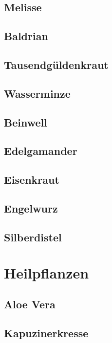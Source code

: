 \subsection{Melisse}

\subsection{Baldrian}

\subsection{Tausendgüldenkraut}

\subsection{Wasserminze}

\subsection{Beinwell}

\subsection{Edelgamander}

\subsection{Eisenkraut}

\subsection{Engelwurz}

\subsection{Silberdistel}



\section{Heilpflanzen}

\lipsum[2]

\subsection{Aloe Vera}

\subsection{Kapuzinerkresse}

